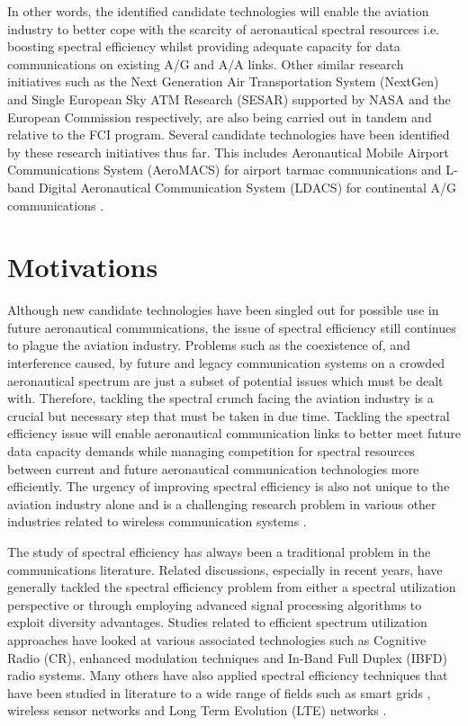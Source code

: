 In other words, the identified candidate technologies will enable the aviation industry to better cope with the scarcity of aeronautical spectral resources i.e. boosting spectral efficiency whilst providing adequate capacity for data communications on existing A/G and A/A links. Other similar research initiatives such as the Next Generation Air Transportation System (NextGen) and Single European Sky ATM Research (SESAR) supported by NASA \cite{wichgers2013study} and the European Commission \cite{BarbaSesar2011} respectively, are also being carried out in tandem and relative to the FCI program. Several candidate technologies have been identified by these research initiatives thus far. This includes Aeronautical Mobile Airport Communications System (AeroMACS) for airport tarmac communications and L-band Digital Aeronautical Communication System (LDACS) for continental A/G communications \cite{neji2013survey}.

\section{Motivations}
Although new candidate technologies have been singled out for possible use in future aeronautical communications, the issue of spectral efficiency still continues to plague the aviation industry. Problems such as the coexistence of, and interference caused, by future and legacy communication systems on a crowded aeronautical spectrum are just a subset of potential issues which must be dealt with. Therefore, tackling the spectral crunch facing the aviation industry is a crucial but necessary step that must be taken in due time. Tackling the spectral efficiency issue will enable aeronautical communication links to better meet future data capacity demands while managing competition for spectral resources between current and future aeronautical communication technologies more efficiently. The urgency of improving spectral efficiency is also not unique to the aviation industry alone and is a challenging research problem in various other industries related to wireless communication systems \cite{dai2015non}. 

The study of spectral efficiency has always been a traditional problem in the communications literature. Related discussions, especially in recent years, have generally tackled the spectral efficiency problem from either a spectral utilization perspective or through employing advanced signal processing algorithms to exploit diversity advantages. Studies related to efficient spectrum utilization approaches have looked at various associated technologies such as Cognitive Radio (CR), enhanced modulation techniques and In-Band Full Duplex (IBFD) radio systems. Many others have also applied spectral efficiency techniques that have been studied in literature to a wide range of fields such as smart grids \cite{kouhdaragh2013cognitive}, wireless sensor networks \cite{he2014cr} and Long Term Evolution (LTE) networks \cite{zulhasnine2010efficient}. 

